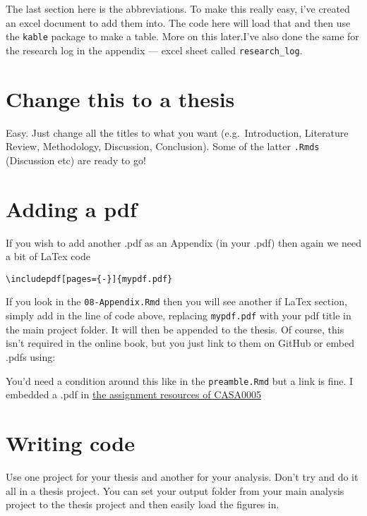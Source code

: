 \documentclass[
  12pt,
  oneside]{book}
\begin{document}
The last section here is the abbreviations. To make this really easy, i've created an excel document to add them into. The code here will load that and then use the \texttt{kable} package to make a table. More on this later.I've also done the same for the research log in the appendix --- excel sheet called \texttt{research\_log}.

\hypertarget{change-this-to-a-thesis}{%
\section{Change this to a thesis}\label{change-this-to-a-thesis}}

Easy. Just change all the titles to what you want (e.g.~Introduction, Literature Review, Methodology, Discussion, Conclusion). Some of the latter \texttt{.Rmds} (Discussion etc) are ready to go!

\hypertarget{adding-a-pdf}{%
\section{Adding a pdf}\label{adding-a-pdf}}

If you wish to add another .pdf as an Appendix (in your .pdf) then again we need a bit of LaTex code

\texttt{\textbackslash{}includepdf{[}pages=\{-\}{]}\{mypdf.pdf\}}

If you look in the \texttt{08-Appendix.Rmd} then you will see another if LaTex section, simply add in the line of code above, replacing \texttt{mypdf.pdf} with your pdf title in the main project folder. It will then be appended to the thesis. Of course, this isn't required in the online book, but you just link to them on GitHub or embed .pdfs using:

You'd need a condition around this like in the \texttt{preamble.Rmd} but a link is fine. I embedded a .pdf in \href{https://andrewmaclachlan.github.io/CASA0005repo/assignment-resources-1.html}{the assignment resources of CASA0005}

\hypertarget{writing-code}{%
\section{Writing code}\label{writing-code}}

Use one project for your thesis and another for your analysis. Don't try and do it all in a thesis project. You can set your output folder from your main analysis project to the thesis project and then easily load the figures in.
\end{document}
